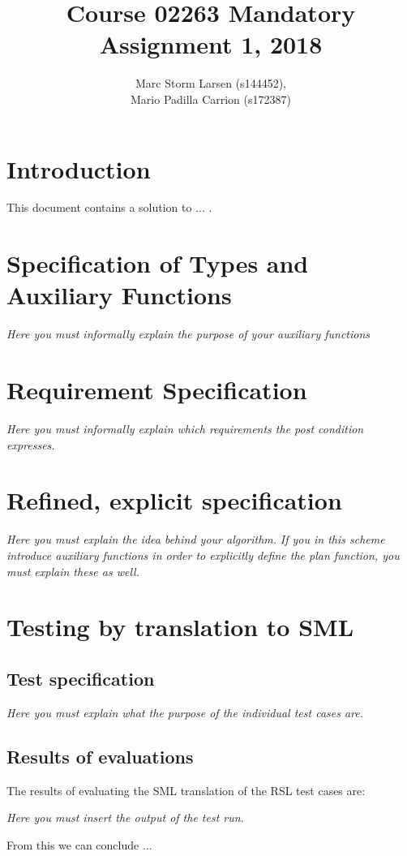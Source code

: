 \documentclass[a4]{article}
\title{Course 02263 Mandatory Assignment 1, 2018}
\author{Marc Storm Larsen (s144452),\\ 
        Mario Padilla Carrion (s172387)}
\begin{document}
\maketitle

\tableofcontents
\newpage

\section{Introduction}
This document contains a solution to ... . 

\section{Specification of Types and Auxiliary Functions}


  

{\em Here you must informally explain the purpose of your auxiliary functions}

\section{Requirement Specification}

  

{\em Here you must informally explain which requirements the post
  condition expresses.}

\section{Refined, explicit specification}

  

{\em Here you must  explain the idea behind your algorithm.}
{\em If you in this scheme introduce auxiliary functions in order to explicitly
  define the plan function, you must explain these as well.}

\section{Testing by translation to SML}

\subsection{Test specification}


        
{\em Here you must  explain what the purpose of the individual test
  cases are.}


\subsection{Results of evaluations}


The results of evaluating the SML translation of the RSL test cases are:

{\em Here you must  insert the output of the test run.}



\noindent From this we can conclude ...
\end{document}
